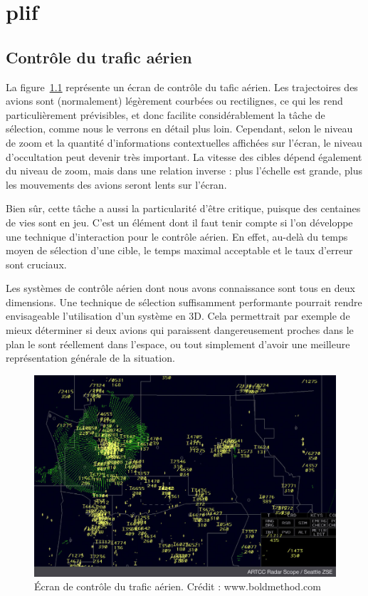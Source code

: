 
\chapter[Contexte/Besoin/Applications]{plif}
\minitoc
\label{chap1}
\cleardoublepage

    \section{Contrôle du trafic aérien}
    La figure~\ref{fig:airtraffic} représente un écran de contrôle du tafic aérien. Les trajectoires des avions sont (normalement) légèrement courbées ou rectilignes, ce qui les rend particulièrement prévisibles, et donc facilite considérablement la tâche de sélection, comme nous le verrons en détail plus loin. Cependant, selon le niveau de zoom et la quantité d'informations contextuelles affichées sur l'écran, le niveau d'occultation peut devenir très important. La vitesse des cibles dépend également du niveau de zoom, mais dans une relation inverse : plus l'échelle est grande, plus les mouvements des avions seront lents sur l'écran.
    
    Bien sûr, cette tâche a aussi la particularité d'être critique, puisque des centaines de vies sont en jeu. C'est un élément dont il faut tenir compte si l'on développe une technique d'interaction pour le contrôle aérien. En effet, au-delà du temps moyen de sélection d'une cible, le temps maximal acceptable et le taux d'erreur sont cruciaux.
    
    Les systèmes de contrôle aérien dont nous avons connaissance sont tous en deux dimensions. Une technique de sélection suffisamment performante pourrait rendre envisageable l'utilisation d'un système en 3D. Cela permettrait par exemple de mieux déterminer si deux avions qui paraissent dangereusement proches dans le plan le sont réellement dans l'espace, ou tout simplement d'avoir une meilleure représentation générale de la situation.
    
	\begin{figure}[h]
		\centering
		\includegraphics[width=\textwidth]{figures/Radar-Scope-ZSE}
		\caption{Écran de contrôle du trafic aérien. Crédit : www.boldmethod.com}
		\label{fig:airtraffic}
	\end{figure}
    
